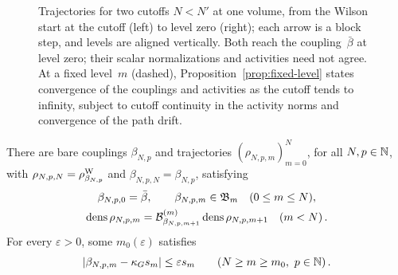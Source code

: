 \begin{figure}[ht]
\centering
{}
\caption{Trajectories for two cutoffs $N<N'$ at one volume, from the Wilson start at the cutoff (left) to level zero (right); each arrow is a block step, and levels are aligned vertically. Both reach the coupling~$\bar\beta$ at level zero; their scalar normalizations and activities need not agree. At a fixed level~$m$ (dashed), Proposition~\ref{prop:fixed-level} states convergence of the couplings and activities as the cutoff tends to infinity, subject to cutoff continuity in the activity norms and convergence of the path drift.}\label{fig:two-cutoffs}
\end{figure}

\begin{theorem}\label{prop:MT}
There are bare couplings $\beta_{N,p}$ and trajectories $(\rho_{N,p,m})_{m=0}^N$, for all $N,p\in\mathbb{N}$, with $\rho_{N,p,N}=\rho^{\rm W}_{\beta_{N,p}}$ and $\beta_{N,p,N}=\beta_{N,p}$, satisfying
\begin{gather*}
\beta_{N,p,0}=\bar\beta,\qquad \beta_{N,p,m}\in\mathfrak B_m\quad(0\le m\le N),\\
\operatorname{dens}\rho_{N,p,m}=\mathcal{B}^{(m)}_{\beta_{N,p,m+1}}\operatorname{dens}\rho_{N,p,m+1}\quad(m<N)\,.
\end{gather*}
For every $\varepsilon>0$, some $m_0(\varepsilon)$ satisfies
\begin{equation*}
|\beta_{N,p,m}-\kappa_G s_m|\le\varepsilon s_m
\qquad(N\ge m\ge m_0,\ p\in\mathbb{N})\,.
\end{equation*}
\end{theorem}

